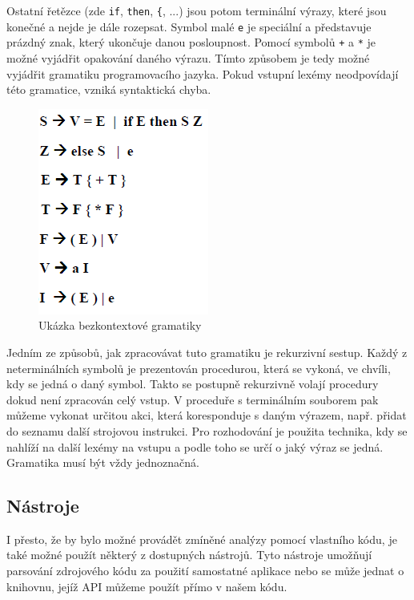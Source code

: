 			Ostatní řetězce (zde \texttt{if}, \texttt{then}, \texttt{\{}, ...) jsou potom terminální výrazy, které jsou konečné a nejde je dále rozepsat. Symbol malé \texttt{e} je speciální a představuje prázdný znak, který ukončuje danou posloupnost. Pomocí symbolů \texttt{+} a \texttt{*} je možné vyjádřit opakování daného výrazu. Tímto způsobem je tedy možné vyjádřit gramatiku programovacího jazyka. Pokud vstupní lexémy neodpovídají této gramatice, vzniká syntaktická chyba.
			
			\begin{figure}[!htb]
					\centering
					\includegraphics{img/gramatika.png}
					\caption[bkg]{Ukázka bezkontextové gramatiky}
					\label{bkg}
				\endminipage\hfill
			\end{figure}
			
			Jedním ze způsobů, jak zpracovávat tuto gramatiku je rekurzivní sestup. Každý z neterminálních symbolů je prezentován procedurou, která se vykoná, ve chvíli, kdy se jedná o daný symbol. Takto se postupně rekurzivně volají procedury dokud není zpracován celý vstup. V proceduře s terminálním souborem pak můžeme vykonat určitou akci, která koresponduje s daným výrazem, např. přidat do seznamu další strojovou instrukci. Pro rozhodování je použita technika, kdy se nahlíží na další lexémy na vstupu a podle toho se určí o jaký výraz se jedná. Gramatika musí být vždy jednoznačná.
			
		\subsection{Nástroje}
			I přesto, že by bylo možné provádět zmíněné analýzy pomocí vlastního kódu, je také možné použít některý z dostupných nástrojů. Tyto nástroje umožňují parsování zdrojového kódu za použití samostatné aplikace nebo se může jednat o knihovnu, jejíž API můžeme použít přímo v našem kódu.
			
